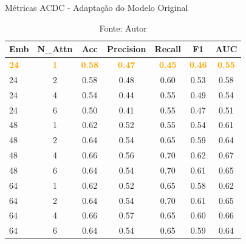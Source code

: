 \begin{table}[htbp]
\centering
\caption{Métricas ACDC - Adaptação do Modelo Original}
\begin{tabular}{lcccccc}
\toprule
\textbf{Emb} & \textbf{N\_Attn} & \textbf{Acc} & \textbf{Precision} & \textbf{Recall} & \textbf{F1} & \textbf{AUC} \\
\midrule
\textcolor{orange}{\textbf{24}} & \textcolor{orange}{\textbf{1}} & \textcolor{orange}{\textbf{0.58}} & \textcolor{orange}{\textbf{0.47}} & \textcolor{orange}{\textbf{0.45}} & \textcolor{orange}{\textbf{0.46}} & \textcolor{orange}{\textbf{0.55}} \\
24 & 2 & 0.58 & 0.48 & 0.60 & 0.53 & 0.58 \\
24 & 4 & 0.54 & 0.44 & 0.55 & 0.49 & 0.54 \\
24 & 6 & 0.50 & 0.41 & 0.55 & 0.47 & 0.51 \\
\hline
48 & 1 & 0.62 & 0.52 & 0.55 & 0.54 & 0.61 \\
48 & 2 & 0.64 & 0.54 & 0.65 & 0.59 & 0.64 \\
48 & 4 & 0.66 & 0.56 & 0.70 & 0.62 & 0.67 \\
48 & 6 & 0.64 & 0.54 & 0.70 & 0.61 & 0.65 \\
\hline
64 & 1 & 0.62 & 0.52 & 0.65 & 0.58 & 0.62 \\
64 & 2 & 0.64 & 0.54 & 0.70 & 0.61 & 0.65 \\
64 & 4 & 0.66 & 0.57 & 0.65 & 0.60 & 0.66 \\
64 & 6 & 0.64 & 0.54 & 0.65 & 0.59 & 0.64 \\
\bottomrule
\end{tabular}
\caption*{Fonte: Autor}
\label{tab:metrics_acdc_orig}
\end{table}


